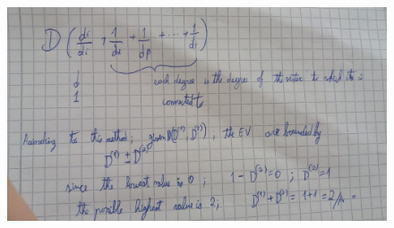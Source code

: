 \documentclass[14pt]{article}
\begin{document}
\begin{description}
\begin{figure}[h]
\end{figure}
\begin{figure}[h]
  \includegraphics[scale=0.35, angle=90]{a10-ex1-a4.jpeg}
\end{figure}


\end{description}
\end{document}
